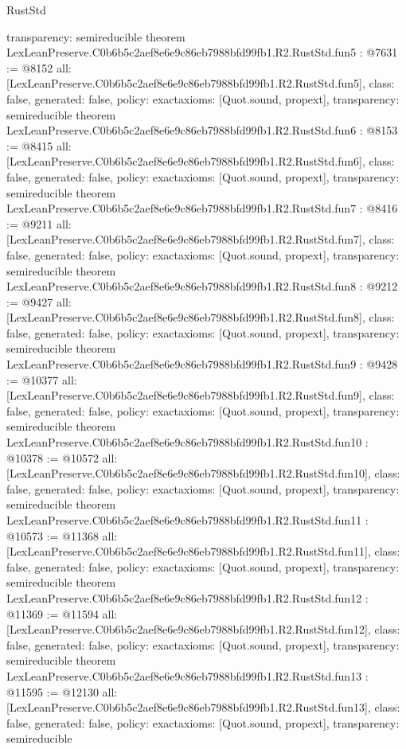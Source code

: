 \begin{lexlean}{RustStd}
\begin{coremodule}
{  transparency: semireducible
}
theorem LexLeanPreserve.C0b6b5c2aef8e6e9c86eb7988bfd99fb1.R2.RustStd.fun5 : @7631 := @8152 {
  all: [LexLeanPreserve.C0b6b5c2aef8e6e9c86eb7988bfd99fb1.R2.RustStd.fun5],
  class: false,
  generated: false,
  policy: exact{axioms: [Quot.sound, propext]},
  transparency: semireducible
}
theorem LexLeanPreserve.C0b6b5c2aef8e6e9c86eb7988bfd99fb1.R2.RustStd.fun6 : @8153 := @8415 {
  all: [LexLeanPreserve.C0b6b5c2aef8e6e9c86eb7988bfd99fb1.R2.RustStd.fun6],
  class: false,
  generated: false,
  policy: exact{axioms: [Quot.sound, propext]},
  transparency: semireducible
}
theorem LexLeanPreserve.C0b6b5c2aef8e6e9c86eb7988bfd99fb1.R2.RustStd.fun7 : @8416 := @9211 {
  all: [LexLeanPreserve.C0b6b5c2aef8e6e9c86eb7988bfd99fb1.R2.RustStd.fun7],
  class: false,
  generated: false,
  policy: exact{axioms: [Quot.sound, propext]},
  transparency: semireducible
}
theorem LexLeanPreserve.C0b6b5c2aef8e6e9c86eb7988bfd99fb1.R2.RustStd.fun8 : @9212 := @9427 {
  all: [LexLeanPreserve.C0b6b5c2aef8e6e9c86eb7988bfd99fb1.R2.RustStd.fun8],
  class: false,
  generated: false,
  policy: exact{axioms: [Quot.sound, propext]},
  transparency: semireducible
}
theorem LexLeanPreserve.C0b6b5c2aef8e6e9c86eb7988bfd99fb1.R2.RustStd.fun9 : @9428 := @10377 {
  all: [LexLeanPreserve.C0b6b5c2aef8e6e9c86eb7988bfd99fb1.R2.RustStd.fun9],
  class: false,
  generated: false,
  policy: exact{axioms: [Quot.sound, propext]},
  transparency: semireducible
}
theorem LexLeanPreserve.C0b6b5c2aef8e6e9c86eb7988bfd99fb1.R2.RustStd.fun10 : @10378 := @10572 {
  all: [LexLeanPreserve.C0b6b5c2aef8e6e9c86eb7988bfd99fb1.R2.RustStd.fun10],
  class: false,
  generated: false,
  policy: exact{axioms: [Quot.sound, propext]},
  transparency: semireducible
}
theorem LexLeanPreserve.C0b6b5c2aef8e6e9c86eb7988bfd99fb1.R2.RustStd.fun11 : @10573 := @11368 {
  all: [LexLeanPreserve.C0b6b5c2aef8e6e9c86eb7988bfd99fb1.R2.RustStd.fun11],
  class: false,
  generated: false,
  policy: exact{axioms: [Quot.sound, propext]},
  transparency: semireducible
}
theorem LexLeanPreserve.C0b6b5c2aef8e6e9c86eb7988bfd99fb1.R2.RustStd.fun12 : @11369 := @11594 {
  all: [LexLeanPreserve.C0b6b5c2aef8e6e9c86eb7988bfd99fb1.R2.RustStd.fun12],
  class: false,
  generated: false,
  policy: exact{axioms: [Quot.sound, propext]},
  transparency: semireducible
}
theorem LexLeanPreserve.C0b6b5c2aef8e6e9c86eb7988bfd99fb1.R2.RustStd.fun13 : @11595 := @12130 {
  all: [LexLeanPreserve.C0b6b5c2aef8e6e9c86eb7988bfd99fb1.R2.RustStd.fun13],
  class: false,
  generated: false,
  policy: exact{axioms: [Quot.sound, propext]},
  transparency: semireducible
}
\end{coremodule}
\end{lexlean}
